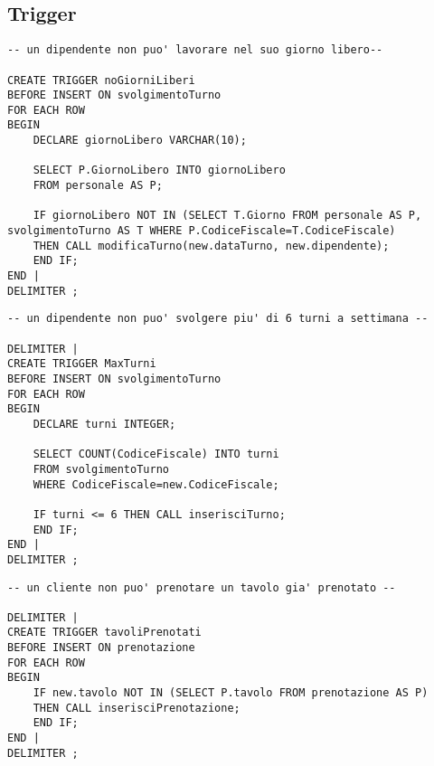 \subsection{Trigger} %
\begin{lstlisting}[title=Regola di vincolo 1, style=mysqlStyle]
-- un dipendente non puo' lavorare nel suo giorno libero--

CREATE TRIGGER noGiorniLiberi
BEFORE INSERT ON svolgimentoTurno
FOR EACH ROW
BEGIN
    DECLARE giornoLibero VARCHAR(10);
    
    SELECT P.GiornoLibero INTO giornoLibero
    FROM personale AS P;
    
    IF giornoLibero NOT IN (SELECT T.Giorno FROM personale AS P, svolgimentoTurno AS T WHERE P.CodiceFiscale=T.CodiceFiscale)
    THEN CALL modificaTurno(new.dataTurno, new.dipendente);
    END IF;
END |
DELIMITER ;
\end{lstlisting}

\begin{lstlisting}[title=Regola di vincolo 2, style=mysqlStyle]
-- un dipendente non puo' svolgere piu' di 6 turni a settimana --

DELIMITER |
CREATE TRIGGER MaxTurni
BEFORE INSERT ON svolgimentoTurno
FOR EACH ROW
BEGIN
    DECLARE turni INTEGER;
    
    SELECT COUNT(CodiceFiscale) INTO turni
    FROM svolgimentoTurno
    WHERE CodiceFiscale=new.CodiceFiscale;
    
    IF turni <= 6 THEN CALL inserisciTurno;
    END IF;
END |
DELIMITER ;
\end{lstlisting}
\begin{lstlisting}[title=Regola di vincolo 3, style=mysqlStyle]
-- un cliente non puo' prenotare un tavolo gia' prenotato --

DELIMITER |
CREATE TRIGGER tavoliPrenotati
BEFORE INSERT ON prenotazione
FOR EACH ROW
BEGIN
    IF new.tavolo NOT IN (SELECT P.tavolo FROM prenotazione AS P)
    THEN CALL inserisciPrenotazione;
    END IF;
END |
DELIMITER ;
\end{lstlisting}

